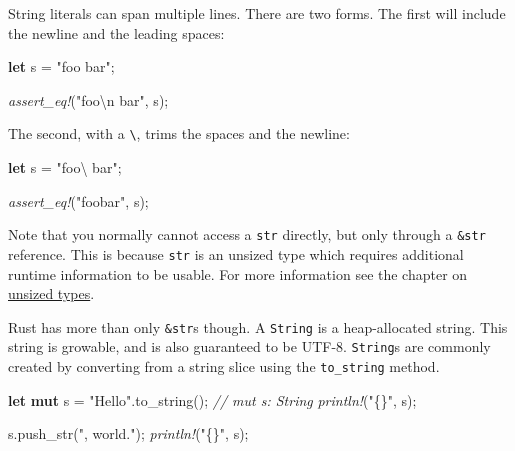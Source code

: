 \documentclass[a4paper,]{book}
\newenvironment{Shaded}{\begin{snugshade}}{\end{snugshade}}
\newcommand{\KeywordTok}[1]{\textcolor[rgb]{0.13,0.29,0.53}{\textbf{{#1}}}}
\newcommand{\SpecialCharTok}[1]{\textcolor[rgb]{0.00,0.00,0.00}{{#1}}}
\newcommand{\StringTok}[1]{\textcolor[rgb]{0.31,0.60,0.02}{{#1}}}
\newcommand{\CommentTok}[1]{\textcolor[rgb]{0.56,0.35,0.01}{\textit{{#1}}}}
\newcommand{\PreprocessorTok}[1]{\textcolor[rgb]{0.56,0.35,0.01}{\textit{{#1}}}}
\newcommand{\NormalTok}[1]{{#1}}
\begin{document}
String literals can span multiple lines. There are two forms. The first
will include the newline and the leading spaces:

\begin{Shaded}
\begin{Highlighting}[]
\KeywordTok{let} \NormalTok{s = }\StringTok{"foo}
\StringTok{    bar"}\NormalTok{;}

\PreprocessorTok{assert_eq!}\NormalTok{(}\StringTok{"foo}\SpecialCharTok{\textbackslash{}n}\StringTok{    bar"}\NormalTok{, s);}
\end{Highlighting}
\end{Shaded}

The second, with a \texttt{\textbackslash{}}, trims the spaces and the
newline:

\begin{Shaded}
\begin{Highlighting}[]
\KeywordTok{let} \NormalTok{s = }\StringTok{"foo}\SpecialCharTok{\textbackslash{}}
\StringTok{    bar"}\NormalTok{;}

\PreprocessorTok{assert_eq!}\NormalTok{(}\StringTok{"foobar"}\NormalTok{, s);}
\end{Highlighting}
\end{Shaded}

Note that you normally cannot access a \texttt{str} directly, but only
through a \texttt{\&str} reference. This is because \texttt{str} is an
unsized type which requires additional runtime information to be usable.
For more information see the chapter on
\protect\hyperlink{sec--unsized-types}{unsized types}.

Rust has more than only \texttt{\&str}s though. A \texttt{String} is a
heap-allocated string. This string is growable, and is also guaranteed
to be UTF-8. \texttt{String}s are commonly created by converting from a
string slice using the \texttt{to\_string} method.

\begin{Shaded}
\begin{Highlighting}[]
\KeywordTok{let} \KeywordTok{mut} \NormalTok{s = }\StringTok{"Hello"}\NormalTok{.to_string(); }\CommentTok{// mut s: String}
\PreprocessorTok{println!}\NormalTok{(}\StringTok{"\{\}"}\NormalTok{, s);}

\NormalTok{s.push_str(}\StringTok{", world."}\NormalTok{);}
\PreprocessorTok{println!}\NormalTok{(}\StringTok{"\{\}"}\NormalTok{, s);}
\end{Highlighting}
\end{Shaded}
\end{document}
